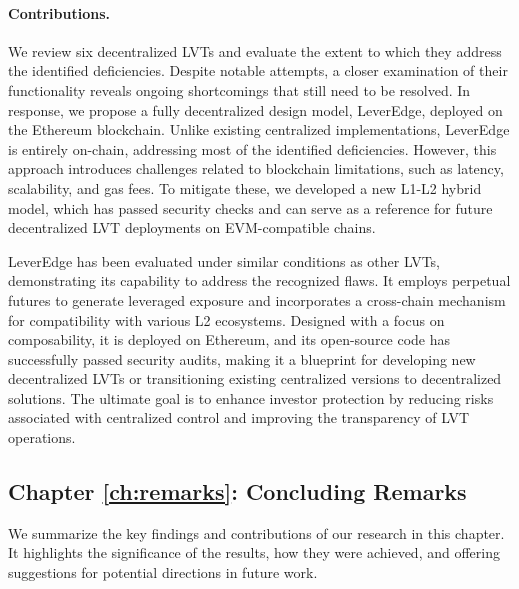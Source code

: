 \paragraph{Contributions.} We review six decentralized LVTs and evaluate the extent to which they address the identified deficiencies. Despite notable attempts, a closer examination of their functionality reveals ongoing shortcomings that still need to be resolved. In response, we propose a fully decentralized design model, LeverEdge, deployed on the Ethereum blockchain. Unlike existing centralized implementations, LeverEdge is entirely on-chain, addressing most of the identified deficiencies. However, this approach introduces challenges related to blockchain limitations, such as latency, scalability, and gas fees. To mitigate these, we developed a new L1-L2 hybrid model, which has passed security checks and can serve as a reference for future decentralized LVT deployments on EVM-compatible chains. 

LeverEdge has been evaluated under similar conditions as other LVTs, demonstrating its capability to address the recognized flaws. It employs perpetual futures to generate leveraged exposure and incorporates a cross-chain mechanism for compatibility with various L2 ecosystems. Designed with a focus on composability, it is deployed on Ethereum, and its open-source code has successfully passed security audits, making it a blueprint for developing new decentralized LVTs or transitioning existing centralized versions to decentralized solutions. The ultimate goal is to enhance investor protection by reducing risks associated with centralized control and improving the transparency of LVT operations.

\subsection{Chapter \ref{ch:remarks}: Concluding Remarks}
We summarize the key findings and contributions of our research in this chapter. It highlights the significance of the results, how they were achieved, and offering suggestions for potential directions in future work.

